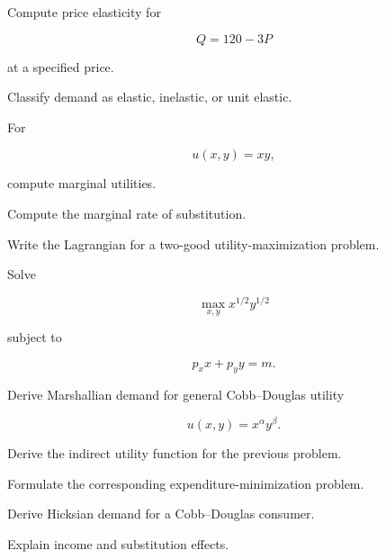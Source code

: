 \begin{exercise}[2]
Compute price elasticity for

\[
Q=120-3P
\]

at a specified price.
\end{exercise}

\begin{exercise}[2]
Classify demand as elastic, inelastic, or unit elastic.
\end{exercise}

\begin{exercise}[2]
For

\[
u(x,y)=xy,
\]

compute marginal utilities.
\end{exercise}

\begin{exercise}[2]
Compute the marginal rate of substitution.
\end{exercise}

\begin{exercise}[2]
Write the Lagrangian for a two-good utility-maximization problem.
\end{exercise}

\begin{exercise}[3]
Solve

\[
\max_{x,y}
x^{1/2}y^{1/2}
\]

subject to

\[
p_xx+p_yy=m.
\]
\end{exercise}

\begin{exercise}[3]
Derive Marshallian demand for general Cobb--Douglas utility

\[
u(x,y)=x^\alpha y^\beta.
\]
\end{exercise}

\begin{exercise}[3]
Derive the indirect utility function for the previous problem.
\end{exercise}

\begin{exercise}[3]
Formulate the corresponding expenditure-minimization problem.
\end{exercise}

\begin{exercise}[3]
Derive Hicksian demand for a Cobb--Douglas consumer.
\end{exercise}

\begin{exercise}[3]
Explain income and substitution effects.
\end{exercise}

